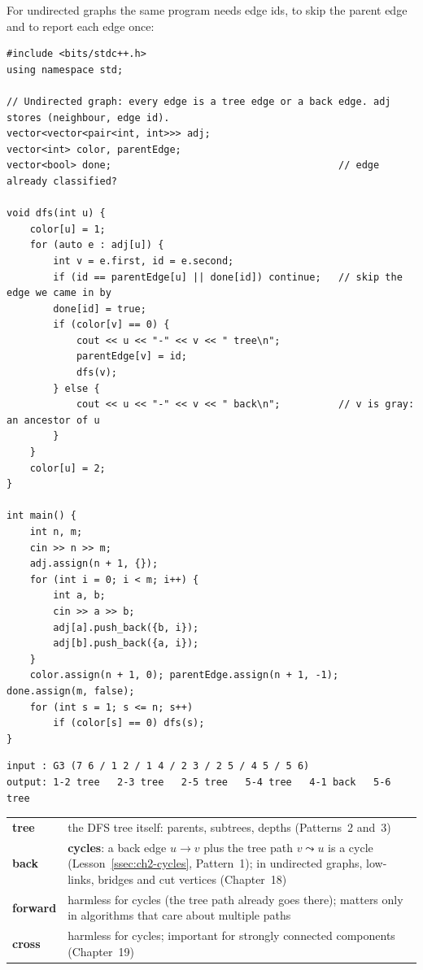 For undirected graphs the same program needs edge ids, to skip the parent edge and to report each edge once:

\begin{lstlisting}[style=cpp]
#include <bits/stdc++.h>
using namespace std;

// Undirected graph: every edge is a tree edge or a back edge. adj stores (neighbour, edge id).
vector<vector<pair<int, int>>> adj;
vector<int> color, parentEdge;
vector<bool> done;                                       // edge already classified?

void dfs(int u) {
    color[u] = 1;
    for (auto e : adj[u]) {
        int v = e.first, id = e.second;
        if (id == parentEdge[u] || done[id]) continue;   // skip the edge we came in by
        done[id] = true;
        if (color[v] == 0) {
            cout << u << "-" << v << " tree\n";
            parentEdge[v] = id;
            dfs(v);
        } else {
            cout << u << "-" << v << " back\n";          // v is gray: an ancestor of u
        }
    }
    color[u] = 2;
}

int main() {
    int n, m;
    cin >> n >> m;
    adj.assign(n + 1, {});
    for (int i = 0; i < m; i++) {
        int a, b;
        cin >> a >> b;
        adj[a].push_back({b, i});
        adj[b].push_back({a, i});
    }
    color.assign(n + 1, 0); parentEdge.assign(n + 1, -1); done.assign(m, false);
    for (int s = 1; s <= n; s++)
        if (color[s] == 0) dfs(s);
}
\end{lstlisting}

\begin{lstlisting}[style=trace]
input : G3 (7 6 / 1 2 / 1 4 / 2 3 / 2 5 / 4 5 / 5 6)
output: 1-2 tree   2-3 tree   2-5 tree   5-4 tree   4-1 back   5-6 tree
\end{lstlisting}

\begin{comparisonbox}
\small
\begin{tabularx}{\linewidth}{@{}>{\bfseries}l X@{}}
tree & the DFS tree itself: parents, subtrees, depths (Patterns~2 and~3) \\
back & \textbf{cycles}: a back edge $u \to v$ plus the tree path $v \leadsto u$ is a cycle (Lesson~\ref{ssec:ch2-cycles}, Pattern~1); in undirected graphs, low-links, bridges and cut vertices (Chapter~18) \\
forward & harmless for cycles (the tree path already goes there); matters only in algorithms that care about multiple paths \\
cross & harmless for cycles; important for strongly connected components (Chapter~19) \\
\end{tabularx}
\end{comparisonbox}

